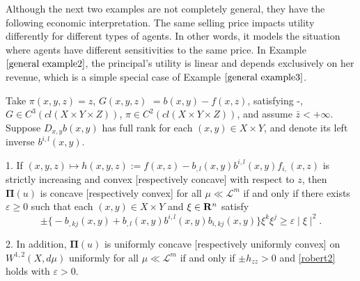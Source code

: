 Although 
the next two examples are not completely general, they have the following economic interpretation. The same selling price impacts utility differently for different types of agents. In other words, it models the situation where agents have different sensitivities to the same price.  In Example $\ref{general example2}$,  the principal's utility is linear and depends exclusively on her revenue, which is a simple special case of Example $\ref{general example3}$.
\medskip

\begin{example}\label{general example2}
	Take $\pi(x, y, z) =z$,  $G(x,y,z)$ $= b(x,y)-f(x,z)$,  satisfying \Gzero-\Gsix,  $G \in C^3(cl(X\times Y \times Z)
	)$, $\pi \in C^2(cl(X\times Y \times Z)
	)$, and assume $\bar{z}<+\infty$. Suppose $D_{x,y}b(x,y)$ has full rank for each $(x,y) \in X\times Y$, and denote its left inverse $b^{i,l}(x,y).$
	
	1. If $(x,y,z)\longmapsto h(x,y,z):=f(x,z)-b_{,l}(x,y)b^{i,l}(x,y)f_{i,}(x,z)$ is strictly increasing and convex [respectively concave] with respect to $z$, then $\pmb \Pi(u)$ is concave [respectively convex]  for all $\mu\ll \mathcal{L}^m$ if and only if there exists $\varepsilon \ge 0$ such that each $(x,y) \in X \times Y$ and $\xi \in {\mathbf R}^{n}$ satisfy
	\begin{equation}\label{robert2}
	\pm \Big\{-b_{,kj}(x,y)+b_{,l}(x,y)b^{i,l}(x,y) b_{i,kj}(x,y)\Big\} \xi^{k}\xi^{j} \ge  \varepsilon \mid \xi\mid ^2.
	\end{equation}
	
	2. In addition, $\pmb \Pi(u)$ is uniformly concave [respectively uniformly convex] on $W^{1,2}(X,d\mu)$ uniformly for all $\mu\ll \mathcal{L}^m$ if and only  if $\pm h_{zz}> 0$ and \eqref{robert2} holds with $\varepsilon >0$.
	
\end{example}


